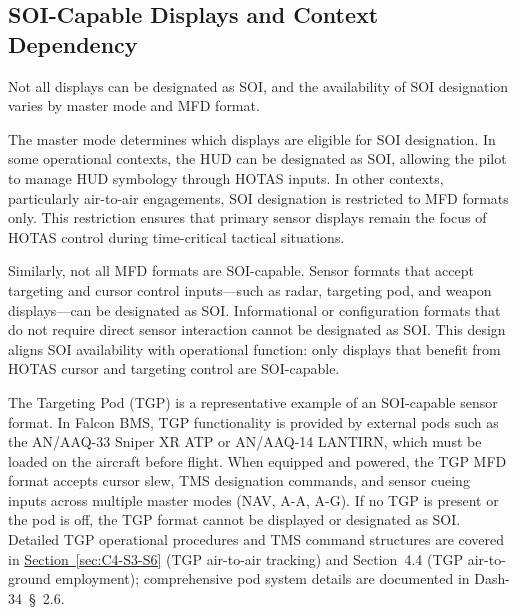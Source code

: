 \documentclass[11pt, a4paper, twoside]{report}
\newcommand{\dashref}[1]{Dash-34~\S~#1}
\newcommand{\secref}[1]{\hyperref[#1]{Section~\ref*{#1}}}
\begin{document}

\subsection{SOI-Capable Displays and Context Dependency}
\label{sec:C2-S1-S3}

Not all displays can be designated as SOI, and the availability of SOI designation varies by master mode and MFD format.

The master mode determines which displays are eligible for SOI designation. In some operational contexts, the HUD can be designated as SOI, allowing the pilot to manage HUD symbology through HOTAS inputs. In other contexts, particularly air-to-air engagements, SOI designation is restricted to MFD formats only. This restriction ensures that primary sensor displays remain the focus of HOTAS control during time-critical tactical situations.

Similarly, not all MFD formats are SOI-capable. Sensor formats that accept targeting and cursor control inputs—such as radar, targeting pod, and weapon displays—can be designated as SOI. Informational or configuration formats that do not require direct sensor interaction cannot be designated as SOI. This design aligns SOI availability with operational function: only displays that benefit from HOTAS cursor and targeting control are SOI-capable.

The Targeting Pod (TGP) is a representative example of an SOI-capable sensor format. In Falcon BMS, TGP functionality is provided by external pods such as the AN/AAQ-33 Sniper XR ATP or AN/AAQ-14 LANTIRN, which must be loaded on the aircraft before flight. When equipped and powered, the TGP MFD format accepts cursor slew, TMS designation commands, and sensor cueing inputs across multiple master modes (NAV, A-A, A-G). If no TGP is present or the pod is off, the TGP format cannot be displayed or designated as SOI. Detailed TGP operational procedures and TMS command structures are covered in \secref{sec:C4-S3-S6} (TGP air-to-air tracking) and Section~4.4 (TGP air-to-ground employment); comprehensive pod system details are documented in \dashref{2.6}.
\end{document}

